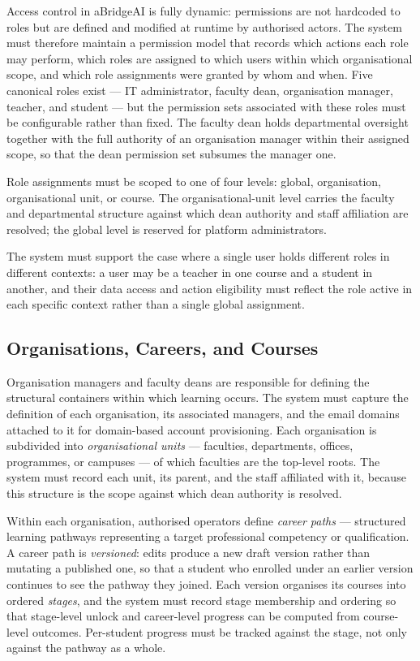 Access control in aBridgeAI is fully dynamic: permissions are not 
hardcoded to roles but are defined and modified at runtime by 
authorised actors. The system must therefore maintain a permission 
model that records which actions each role may perform, which roles 
are assigned to which users within which organisational scope, and
which role assignments were granted by whom and when. Five canonical
roles exist — IT administrator, faculty dean, organisation manager,
teacher, and student — but the permission sets associated with these
roles must be configurable rather than fixed. The faculty dean holds
departmental oversight together with the full authority of an
organisation manager within their assigned scope, so that the dean
permission set subsumes the manager one.

Role assignments must be scoped to one of four levels: global,
organisation, organisational unit, or course. The organisational-unit
level carries the faculty and departmental structure against which
dean authority and staff affiliation are resolved; the global level is
reserved for platform administrators.

The system must support the case where a single user holds different 
roles in different contexts: a user may be a teacher in one course 
and a student in another, and their data access and action 
eligibility must reflect the role active in each specific context 
rather than a single global assignment.

\subsection{Organisations, Careers, and Courses}

Organisation managers and faculty deans are responsible for defining
the structural containers within which learning occurs. The system
must capture the definition of each organisation, its associated
managers, and the email domains attached to it for domain-based
account provisioning. Each organisation is subdivided into
\textit{organisational units} — faculties, departments, offices,
programmes, or campuses — of which faculties are the top-level roots.
The system must record each unit, its parent, and the staff affiliated
with it, because this structure is the scope against which dean
authority is resolved.

Within each organisation, authorised operators define
\textit{career paths} — structured learning pathways representing a
target professional competency or qualification. A career path is
\textit{versioned}: edits produce a new draft version rather than
mutating a published one, so that a student who enrolled under an
earlier version continues to see the pathway they joined. Each version
organises its courses into ordered \textit{stages}, and the system
must record stage membership and ordering so that stage-level unlock
and career-level progress can be computed from course-level outcomes.
Per-student progress must be tracked against the stage, not only
against the pathway as a whole.

